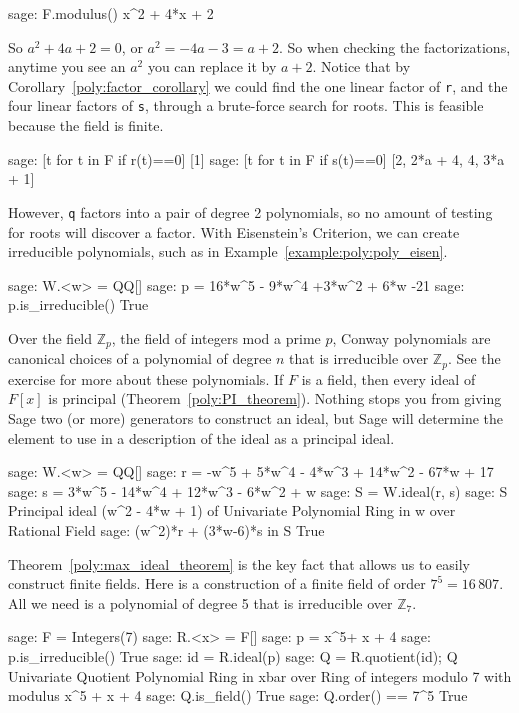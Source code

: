 %
\begin{sageexample}
sage: F.modulus()
x^2 + 4*x + 2
\end{sageexample}
%
So $a^2+4a+2=0$, or $a^2=-4a-3=a+2$.  So when checking the factorizations, anytime you see an $a^2$ you can replace it by $a+2$.  Notice that by Corollary~\ref{poly:factor_corollary} we could find the one linear factor of \verb?r?, and the four linear factors of \verb?s?, through a brute-force search for roots.  This is feasible because the field is finite.
%
\begin{sageexample}
sage: [t for t in F if r(t)==0]
[1]
sage: [t for t in F if s(t)==0]
[2, 2*a + 4, 4, 3*a + 1]
\end{sageexample}
%
However, \verb?q? factors into a pair of degree 2 polynomials, so no amount of testing for roots will discover a factor.
%
With Eisenstein's Criterion, we can create irreducible polynomials, such as in Example~\ref{example:poly:poly_eisen}.
%
\begin{sageexample}
sage: W.<w> = QQ[]
sage: p = 16*w^5 - 9*w^4 +3*w^2 + 6*w -21
sage: p.is_irreducible()
True
\end{sageexample}
%
Over the field ${\mathbb Z}_p$, the field of integers mod a prime $p$, Conway polynomials are canonical choices of a polynomial of degree $n$ that is irreducible over ${\mathbb Z}_p$.  See the exercise for more about these polynomials.
%
%
If $F$ is a field, then every ideal of $F[x]$ is principal (Theorem~\ref{poly:PI_theorem}).  Nothing stops you from giving Sage two (or more) generators to construct an ideal, but Sage will determine the element to use in a description of the ideal as a principal ideal.
%
\begin{sageexample}
sage: W.<w> = QQ[]
sage: r = -w^5 + 5*w^4 - 4*w^3 + 14*w^2 - 67*w + 17
sage: s = 3*w^5 - 14*w^4 + 12*w^3 - 6*w^2 + w
sage: S = W.ideal(r, s)
sage: S
Principal ideal (w^2 - 4*w + 1) of
Univariate Polynomial Ring in w over Rational Field
sage: (w^2)*r + (3*w-6)*s in S
True
\end{sageexample}
%
Theorem~\ref{poly:max_ideal_theorem} is the key fact that allows us to easily construct finite fields.  Here is a construction of a finite field of order $7^5=16\,807$.  All we need is a polynomial of degree 5 that is irreducible over ${\mathbb Z}_7$.
%
\begin{sageexample}
sage: F = Integers(7)
sage: R.<x> = F[]
sage: p = x^5+ x + 4
sage: p.is_irreducible()
True
sage: id = R.ideal(p)
sage: Q = R.quotient(id); Q
Univariate Quotient Polynomial Ring in xbar over
Ring of integers modulo 7 with modulus x^5 + x + 4
sage: Q.is_field()
True
sage: Q.order() == 7^5
True
\end{sageexample}
